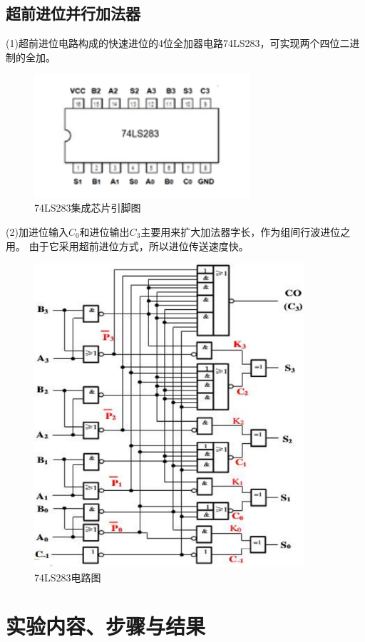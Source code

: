 \documentclass[a4paper,11pt,UTF8]{ctexart}
\begin{document}
 \subsection{超前进位并行加法器}
 (1)超前进位电路构成的快速进位的4位全加器电路74LS283，可实现两个四位二进制的全加。
 \begin{figure}[H]
  \centering
  \includegraphics[width=8cm]{jfqpic7}
  \caption{74LS283集成芯片引脚图}
  \label{fig:jfqpic7}
 \end{figure}
 (2)加进位输入$C_0$和进位输出$C_3$主要用来扩大加法器字长，作为组间行波进位之用。
 由于它采用超前进位方式，所以进位传送速度快。
 \begin{figure}[H]
  \centering
  \includegraphics[width=10cm]{jfqpic8}
  \caption{74LS283电路图}
  \label{fig:jfqpic8}
 \end{figure}



\section{实验内容、步骤与结果}
\end{document}
